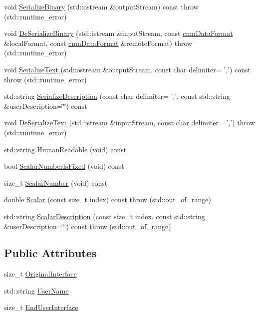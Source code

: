 \begin{DoxyCompactItemize}
\item 
void \hyperlink{classmts_end_user_interface_arg_a125a9e346d3687b334bd5747bf1246b4}{Serialize\-Binary} (std\-::ostream \&output\-Stream) const   throw (std\-::runtime\-\_\-error)
\item 
void \hyperlink{classmts_end_user_interface_arg_ab55a00b8c567da150de851c104485f76}{De\-Serialize\-Binary} (std\-::istream \&input\-Stream, const \hyperlink{classcmn_data_format}{cmn\-Data\-Format} \&local\-Format, const \hyperlink{classcmn_data_format}{cmn\-Data\-Format} \&remote\-Format)  throw (std\-::runtime\-\_\-error)
\item 
void \hyperlink{classmts_end_user_interface_arg_acd15e619df9ee960a31e40255d1d513d}{Serialize\-Text} (std\-::ostream \&output\-Stream, const char delimiter= ',') const   throw (std\-::runtime\-\_\-error)
\item 
std\-::string \hyperlink{classmts_end_user_interface_arg_af1d39679427e5893792730da7c43d2d1}{Serialize\-Description} (const char delimiter= ',', const std\-::string \&user\-Description=\char`\"{}\char`\"{}) const 
\item 
void \hyperlink{classmts_end_user_interface_arg_a7e9a4162c5cc043e2f8b7fa4abbd5e54}{De\-Serialize\-Text} (std\-::istream \&input\-Stream, const char delimiter= ',')  throw (std\-::runtime\-\_\-error)
\item 
std\-::string \hyperlink{classmts_end_user_interface_arg_a77ad225702e52f4c013bb470f62936ff}{Human\-Readable} (void) const 
\item 
bool \hyperlink{classmts_end_user_interface_arg_a5e9fe2a42e555e206fcf0bc7f8323ff7}{Scalar\-Number\-Is\-Fixed} (void) const 
\item 
size\-\_\-t \hyperlink{classmts_end_user_interface_arg_afa2a1b6152a102d552e4e9c6467466ae}{Scalar\-Number} (void) const 
\item 
double \hyperlink{classmts_end_user_interface_arg_af3edfd53df02b3d327e8b806643b521e}{Scalar} (const size\-\_\-t index) const   throw (std\-::out\-\_\-of\-\_\-range)
\item 
std\-::string \hyperlink{classmts_end_user_interface_arg_ae653874248de9fa0e780e2fb8861fba9}{Scalar\-Description} (const size\-\_\-t index, const std\-::string \&user\-Description=\char`\"{}\char`\"{}) const   throw (std\-::out\-\_\-of\-\_\-range)
\end{DoxyCompactItemize}
\subsection*{Public Attributes}
\begin{DoxyCompactItemize}
\item 
size\-\_\-t \hyperlink{classmts_end_user_interface_arg_afcb9d3b4e1fa81a772d60480519232e6}{Original\-Interface}
\item 
std\-::string \hyperlink{classmts_end_user_interface_arg_a0698eac4ba5458816ef097e6094c1036}{User\-Name}
\item 
size\-\_\-t \hyperlink{classmts_end_user_interface_arg_a3eede0e50dd9601400c62f6d545ffa79}{End\-User\-Interface}
\end{DoxyCompactItemize}


